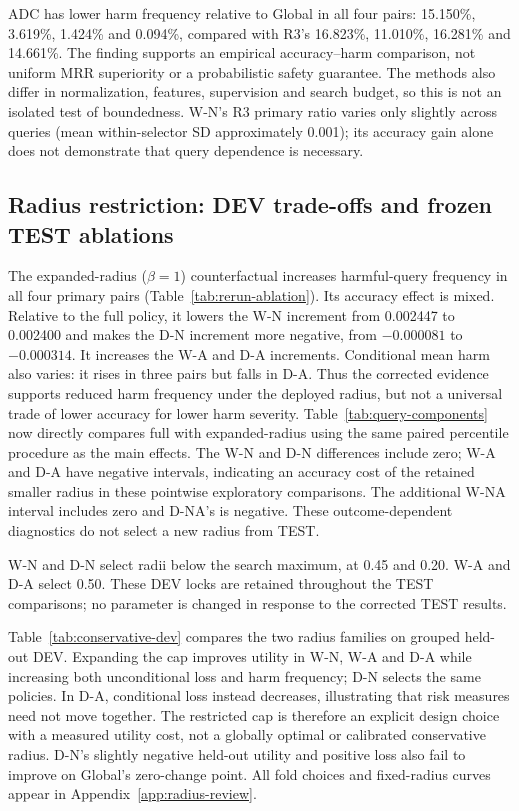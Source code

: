\documentclass[11pt,a4paper]{article}
\begin{document}
ADC has lower harm frequency relative to Global in all four pairs: 15.150\%, 3.619\%, 1.424\% and 0.094\%, compared with R3's 16.823\%, 11.010\%, 16.281\% and 14.661\%. The finding supports an empirical accuracy--harm comparison, not uniform MRR superiority or a probabilistic safety guarantee. The methods also differ in normalization, features, supervision and search budget, so this is not an isolated test of boundedness. W-N's R3 primary ratio varies only slightly across queries (mean within-selector SD approximately 0.001); its accuracy gain alone does not demonstrate that query dependence is necessary.


\subsection{Radius restriction: DEV trade-offs and frozen TEST ablations}
\label{sec:bound-results}
The expanded-radius ($\beta=1$) counterfactual increases harmful-query frequency in all four primary pairs (Table~\ref{tab:rerun-ablation}). Its accuracy effect is mixed. Relative to the full policy, it lowers the W-N increment from 0.002447 to 0.002400 and makes the D-N increment more negative, from $-0.000081$ to $-0.000314$. It increases the W-A and D-A increments. Conditional mean harm also varies: it rises in three pairs but falls in D-A. Thus the corrected evidence supports reduced harm frequency under the deployed radius, but not a universal trade of lower accuracy for lower harm severity.
Table~\ref{tab:query-components} now directly compares full with expanded-radius using the same paired percentile procedure as the main effects. The W-N and D-N differences include zero; W-A and D-A have negative intervals, indicating an accuracy cost of the retained smaller radius in these pointwise exploratory comparisons. The additional W-NA interval includes zero and D-NA's is negative. These outcome-dependent diagnostics do not select a new radius from TEST.

W-N and D-N select radii below the search maximum, at 0.45 and 0.20. W-A and D-A select 0.50. These DEV locks are retained throughout the TEST comparisons; no parameter is changed in response to the corrected TEST results.


Table~\ref{tab:conservative-dev} compares the two radius families on grouped held-out DEV. Expanding the cap improves utility in W-N, W-A and D-A while increasing both unconditional loss and harm frequency; D-N selects the same policies. In D-A, conditional loss instead decreases, illustrating that risk measures need not move together. The restricted cap is therefore an explicit design choice with a measured utility cost, not a globally optimal or calibrated conservative radius. D-N's slightly negative held-out utility and positive loss also fail to improve on Global's zero-change point. All fold choices and fixed-radius curves appear in Appendix~\ref{app:radius-review}.

\end{document}
